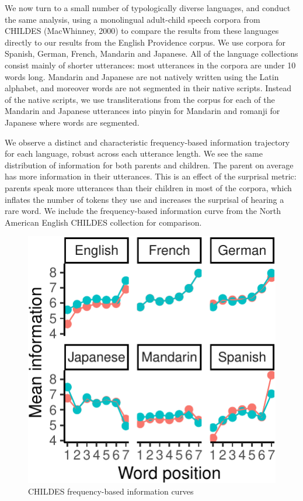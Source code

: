 \documentclass[man,floatsintext]{apa6}
\begin{document}
We now turn to a small number of typologically diverse languages, and conduct the same analysis, using a monolingual adult-child speech corpora from CHILDES (MacWhinney, 2000) to compare the results from these languages directly to our results from the English Providence corpus. We use corpora for Spanish, German, French, Mandarin and Japanese. All of the language collections consist mainly of shorter utterances: most utterances in the corpora are under 10 words long. Mandarin and Japanese are not natively written using the Latin alphabet, and moreover words are not segmented in their native scripts. Instead of the native scripts, we use transliterations from the corpus for each of the Mandarin and Japanese utterances into pinyin for Mandarin and romanji for Japanese where words are segmented.

We observe a distinct and characteristic frequency-based information trajectory for each language, robust across each utterance length. We see the same distribution of information for both parents and children. The parent on average has more information in their utterances. This is an effect of the surprisal metric: parents speak more utterances than their children in most of the corpora, which inflates the number of tokens they use and increases the surprisal of hearing a rare word. We include the frequency-based information curve from the North American English CHILDES collection for comparison.

\begin{figure}
\centering
\includegraphics{figs/unnamed-chunk-1-1.pdf}
\caption{\label{fig:unnamed-chunk-1}CHILDES frequency-based information curves}
\end{figure}
\end{document}
